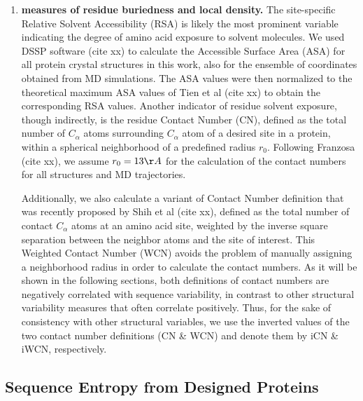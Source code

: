 \documentclass[12pt]{article}
\begin{document}
\begin{enumerate}
            \item {\bf measures of residue buriedness and local density.}
                The site-specific Relative Solvent Accessibility (RSA) is likely the most prominent variable indicating the degree of amino acid exposure to solvent molecules. We used DSSP software (cite xx) to calculate the Accessible Surface Area (ASA) for all protein crystal structures in this work, also for the ensemble of coordinates obtained from MD simulations. The ASA values were then normalized to the theoretical maximum ASA values of Tien et al (cite xx) to obtain the corresponding RSA values. Another indicator of residue solvent exposure, though indirectly, is the residue Contact Number (CN), defined as the total number of $C_\alpha$ atoms surrounding $C_\alpha$ atom of a desired site in a protein, within a spherical neighborhood of a predefined radius $r_0$. Following Franzosa (cite xx), we assume $r_0=13\AA$ for the calculation of the contact numbers for all structures and MD trajectories.

                Additionally, we also calculate a variant of Contact Number definition that was recently proposed by Shih et al (cite xx), defined as the total number of contact $C_\alpha$ atoms at an amino acid site, weighted by the inverse square separation between the neighbor atoms and the site of interest. This Weighted Contact Number (WCN) avoids the problem of manually assigning a neighborhood radius in order to calculate the contact numbers. As it will be shown in the following sections, both definitions of contact numbers are negatively correlated with sequence variability, in contrast to other structural variability measures that often correlate positively. Thus, for the sake of consistency with other structural variables, we use the inverted values of the two contact number definitions (CN \& WCN) and denote them by iCN \& iWCN, respectively.

        \end{enumerate}

\subsection*{Sequence Entropy from Designed Proteins}
\end{document}
